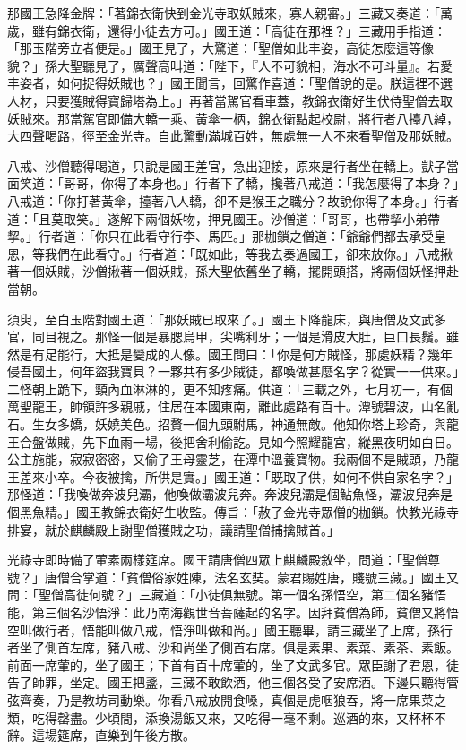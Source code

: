 那國王急降金牌：「著錦衣衛快到金光寺取妖賊來，寡人親審。」三藏又奏道：「萬歲，雖有錦衣衛，還得小徒去方可。」國王道：「高徒在那裡？」三藏用手指道：「那玉階旁立者便是。」國王見了，大驚道：「聖僧如此丰姿，高徒怎麼這等像貌？」孫大聖聽見了，厲聲高叫道：「陛下，『人不可貌相，海水不可斗量』。若愛丰姿者，如何捉得妖賊也？」國王聞言，回驚作喜道：「聖僧說的是。朕這裡不選人材，只要獲賊得寶歸塔為上。」再著當駕官看車蓋，教錦衣衛好生伏侍聖僧去取妖賊來。那當駕官即備大轎一乘、黃傘一柄，錦衣衛點起校尉，將行者八擡八綽，大四聲喝路，徑至金光寺。自此驚動滿城百姓，無處無一人不來看聖僧及那妖賊。

八戒、沙僧聽得喝道，只說是國王差官，急出迎接，原來是行者坐在轎上。獃子當面笑道：「哥哥，你得了本身也。」行者下了轎，攙著八戒道：「我怎麼得了本身？」八戒道：「你打著黃傘，擡著八人轎，卻不是猴王之職分？故說你得了本身。」行者道：「且莫取笑。」遂解下兩個妖物，押見國王。沙僧道：「哥哥，也帶挈小弟帶挈。」行者道：「你只在此看守行李、馬匹。」那枷鎖之僧道：「爺爺們都去承受皇恩，等我們在此看守。」行者道：「既如此，等我去奏過國王，卻來放你。」八戒揪著一個妖賊，沙僧揪著一個妖賊，孫大聖依舊坐了轎，擺開頭搭，將兩個妖怪押赴當朝。

須臾，至白玉階對國王道：「那妖賊已取來了。」國王下降龍床，與唐僧及文武多官，同目視之。那怪一個是暴腮烏甲，尖嘴利牙；一個是滑皮大肚，巨口長鬚。雖然是有足能行，大抵是變成的人像。國王問曰：「你是何方賊怪，那處妖精？幾年侵吾國土，何年盜我寶貝？一夥共有多少賊徒，都喚做甚麼名字？從實一一供來。」二怪朝上跪下，頸內血淋淋的，更不知疼痛。供道：「三載之外，七月初一，有個萬聖龍王，帥領許多親戚，住居在本國東南，離此處路有百十。潭號碧波，山名亂石。生女多嬌，妖嬈美色。招贅一個九頭駙馬，神通無敵。他知你塔上珍奇，與龍王合盤做賊，先下血雨一場，後把舍利偷訖。見如今照耀龍宮，縱黑夜明如白日。公主施能，寂寂密密，又偷了王母靈芝，在潭中溫養寶物。我兩個不是賊頭，乃龍王差來小卒。今夜被擒，所供是實。」國王道：「既取了供，如何不供自家名字？」那怪道：「我喚做奔波兒灞，他喚做灞波兒奔。奔波兒灞是個鮎魚怪，灞波兒奔是個黑魚精。」國王教錦衣衛好生收監。傳旨：「赦了金光寺眾僧的枷鎖。快教光祿寺排宴，就於麒麟殿上謝聖僧獲賊之功，議請聖僧捕擒賊首。」

光祿寺即時備了葷素兩樣筵席。國王請唐僧四眾上麒麟殿敘坐，問道：「聖僧尊號？」唐僧合掌道：「貧僧俗家姓陳，法名玄奘。蒙君賜姓唐，賤號三藏。」國王又問：「聖僧高徒何號？」三藏道：「小徒俱無號。第一個名孫悟空，第二個名豬悟能，第三個名沙悟淨：此乃南海觀世音菩薩起的名字。因拜貧僧為師，貧僧又將悟空叫做行者，悟能叫做八戒，悟淨叫做和尚。」國王聽畢，請三藏坐了上席，孫行者坐了側首左席，豬八戒、沙和尚坐了側首右席。俱是素果、素菜、素茶、素飯。前面一席葷的，坐了國王；下首有百十席葷的，坐了文武多官。眾臣謝了君恩，徒告了師罪，坐定。國王把盞，三藏不敢飲酒，他三個各受了安席酒。下邊只聽得管弦齊奏，乃是教坊司動樂。你看八戒放開食嗓，真個是虎咽狼吞，將一席果菜之類，吃得罄盡。少頃間，添換湯飯又來，又吃得一毫不剩。巡酒的來，又杯杯不辭。這場筵席，直樂到午後方散。

